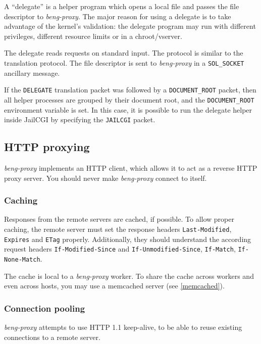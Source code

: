 \documentclass[a4paper,12pt]{article}
\begin{document}
A ``delegate'' is a helper program which opens a local file and passes
the file descriptor to \emph{beng-proxy}.  The major reason for using
a delegate is to take advantage of the kernel's validation: the
delegate program may run with different privileges, different resource
limits or in a chroot/vserver.

The delegate reads requests on standard input.  The protocol is
similar to the translation protocol.  The file descriptor is sent to
\emph{beng-proxy} in a \texttt{SOL\_SOCKET} ancillary message.

If the \texttt{DELEGATE} translation packet was followed by a
\texttt{DOCUMENT\_ROOT} packet, then all helper processes are grouped
by their document root, and the \texttt{DOCUMENT\_ROOT} environment
variable is set.  In this case, it is possible to run the delegate
helper inside JailCGI by specifying the \texttt{JAILCGI} packet.

\subsection{HTTP proxying}
\label{http}

\emph{beng-proxy} implements an HTTP client, which allows it to act as
a reverse HTTP proxy server.  You should never make \emph{beng-proxy}
connect to itself.

\subsubsection{Caching}
\label{caching}

Responses from the remote servers are cached, if possible.  To allow
proper caching, the remote server must set the response headers
\texttt{Last-Modified}, \texttt{Expires} and \texttt{ETag} properly.
Additionally, they should understand the according request headers
\texttt{If-Modified-Since} and \texttt{If-Unmodified-Since},
\texttt{If-Match}, \texttt{If-None-Match}.

The cache is local to a \emph{beng-proxy} worker.  To share the cache
across workers and even across hosts, you may use a memcached server
(see \ref{memcached}).

\subsubsection{Connection pooling}

\emph{beng-proxy} attempts to use HTTP 1.1 keep-alive, to be able to
reuse existing connections to a remote server.
\end{document}
